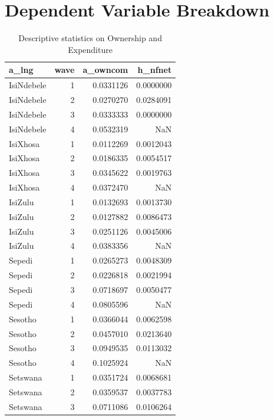 \documentclass[a4paper,british]{article}\usepackage[]{graphicx}\usepackage[]{color}
\newenvironment{knitrout}{}{} %
\begin{document}
\section{Dependent Variable Breakdown}

\begin{table}[H]
\caption{Descriptive statistics on Ownership and Expenditure}
\label{tab:dep_vars}
\centering{}
\begin{knitrout}
\color{fgcolor}


\begin{tabular}{l|r|r|r}
\hline
a\_lng & wave & a\_owncom & h\_nfnet\\
\hline
IsiNdebele & 1 & 0.0331126 & 0.0000000\\
\hline
IsiNdebele & 2 & 0.0270270 & 0.0284091\\
\hline
IsiNdebele & 3 & 0.0333333 & 0.0000000\\
\hline
IsiNdebele & 4 & 0.0532319 & NaN\\
\hline
IsiXhosa & 1 & 0.0112269 & 0.0012043\\
\hline
IsiXhosa & 2 & 0.0186335 & 0.0054517\\
\hline
IsiXhosa & 3 & 0.0345622 & 0.0019763\\
\hline
IsiXhosa & 4 & 0.0372470 & NaN\\
\hline
IsiZulu & 1 & 0.0132693 & 0.0013730\\
\hline
IsiZulu & 2 & 0.0127882 & 0.0086473\\
\hline
IsiZulu & 3 & 0.0251126 & 0.0045006\\
\hline
IsiZulu & 4 & 0.0383356 & NaN\\
\hline
Sepedi & 1 & 0.0265273 & 0.0048309\\
\hline
Sepedi & 2 & 0.0226818 & 0.0021994\\
\hline
Sepedi & 3 & 0.0718697 & 0.0050477\\
\hline
Sepedi & 4 & 0.0805596 & NaN\\
\hline
Sesotho & 1 & 0.0366044 & 0.0062598\\
\hline
Sesotho & 2 & 0.0457010 & 0.0213640\\
\hline
Sesotho & 3 & 0.0949535 & 0.0113032\\
\hline
Sesotho & 4 & 0.1025924 & NaN\\
\hline
Setswana & 1 & 0.0351724 & 0.0068681\\
\hline
Setswana & 2 & 0.0359537 & 0.0037783\\
\hline
Setswana & 3 & 0.0711086 & 0.0106264\\

\end{tabular}
\end{knitrout}
\end{table}
\end{document}
